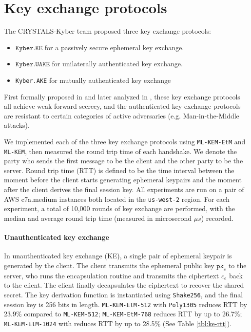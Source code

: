 \documentclass[runningheads]{llncs}
\newcommand{\pk}{\texttt{pk}}
\begin{document}
\section{Key exchange protocols}\label{sec:key-exchange-protocols}
The CRYSTALS-Kyber team \cite{DBLP:conf/eurosp/BosDKLLSSSS18} proposed three key exchange protocols:\begin{itemize}
    \item $\texttt{Kyber.KE}$ for a passively secure ephemeral key exchange.
    \item $\texttt{Kyber.UAKE}$ for unilaterally authenticated key exchange.
    \item \texttt{Kyber.AKE} for mutually authenticated key exchange
\end{itemize}

First formally proposed in \cite{DBLP:conf/stoc/BellareCK98} and later analyzed in \cite{DBLP:conf/eurocrypt/CanettiK01}, these key exchange protocols all achieve weak forward secrecy, and the authenticated key exchange protocols are resistant to certain categories of active adversaries (e.g. Man-in-the-Middle attacks).

We implemented each of the three key exchange protocols using \texttt{ML-KEM-EtM} and \texttt{ML-KEM}, then measured the round trip time of each handshake. We denote the party who sends the first message to be the client and the other party to be the server. Round trip time (RTT) is defined to be the time interval between the moment before the client starts generating ephemeral keypairs and the moment after the client derives the final session key. All experiments are run on a pair of AWS c7a.medium instances both located in the \texttt{us-west-2} region. For each experiment, a total of 10,000 rounds of key exchange are performed, with the median and average round trip time (measured in microsecond $\mu s$) recorded.

\paragraph{Unauthenticated key exchange}
In unauthenticated key exchange (KE), a single pair of ephemeral keypair is generated by the client. The client transmits the ephemeral public key $\pk_e$ to the server, who runs the encapsulation routine and transmits the ciphertext $c_e$ back to the client. The client finally decapsulates the ciphertext to recover the shared secret. The key derivation function is instantiated using \texttt{Shake256}, and the final session key is 256 bits in length. \texttt{ML-KEM-EtM-512} with \texttt{Poly1305} reduces RTT by 23.9\% compared to \texttt{ML-KEM-512}; \texttt{ML-KEM-EtM-768} reduces RTT by up to 26.7\%; \texttt{ML-KEM-EtM-1024} with reduces RTT by up to 28.5\% (See Table \ref{tbl:ke-rtt}).
\end{document}
